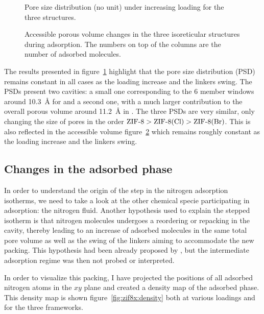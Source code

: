 \documentclass[thesis]{subfiles}
\begin{document}
\begin{figure}[ht]
    \centering
    
    \caption{Pore size distribution (no unit) under increasing loading for the
    three structures.}
    \label{fig:zif8x:pores-sizes}
\end{figure}

\begin{figure}[ht]
    \centering
    
    \caption{Accessible porous volume changes in the three isoreticular
    structures during adsorption. The numbers on top of the columns are the
    number of adsorbed  molecules.}
    \label{fig:zif8x:porous-volume}
\end{figure}

The results presented in figure~\ref{fig:zif8x:pores-sizes} highlight that the
pore size distribution (PSD) remains constant in all cases as the loading
increase and the linkers swing. The PSDs present two cavities: a small one
corresponding to the 6 member windows around \SI{10.3}{\AA} for  and a
second one, with a much larger contribution to the overall porous volume around
\SI{11.2}{\AA} in . The three PSDs are very similar, only changing the size
of pores in the order $\text{\ZIF8} > \text{\ZIFCl} > \text{\ZIFBr}$. This is
also reflected in the accessible volume figure~\ref{fig:zif8x:porous-volume}
which remains roughly constant as the loading increase and the linkers swing.

\subsection{Changes in the adsorbed phase}

In order to understand the origin of the step in the nitrogen adsorption
isotherms, we need to take a look at the other chemical specie participating in
adsorption: the nitrogen fluid. Another hypothesis used to explain the stepped
isotherm is that nitrogen molecules undergoes a reordering or repacking in the
cavity, thereby leading to an increase of adsorbed molecules in the same total
pore volume as well as the swing of the linkers aiming to accommodate the new
packing. This hypothesis had been already proposed by
\citeauthor{Ania2012}\cite{Ania2012}, but the intermediate adsorption regime was
then not probed or interpreted.

In order to visualize this packing, I have projected the positions of all
adsorbed nitrogen atoms in the $xy$ plane and created a density map of the
adsorbed phase. This density map is shown figure~\ref{fig:zif8x:density} both at
various loadings and for the three frameworks.
\end{document}
